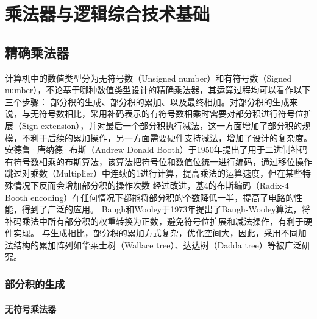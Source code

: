 \chapter{乘法器与逻辑综合技术基础}

\section{精确乘法器} \label{精确乘法器}


计算机中的数值类型分为无符号数（Unsigned number）和有符号数（Signed number），不论基于哪种数值类型设计的精确乘法器，其运算过程均可以看作以下三个步骤： 部分积的生成、部分积的累加、以及最终相加。对部分积的生成来说，与无符号数相比，采用补码表示的有符号数相乘时需要对部分积进行符号位扩展（Sign extension），并对最后一个部分积执行减法，这一方面增加了部分积的规模，不利于后续的累加操作，另一方面需要硬件支持减法，增加了设计的复杂度。
安德鲁·唐纳德·布斯（Andrew Donald Booth）于1950年提出了用于二进制补码有符号数相乘的布斯算法\cite{EM:booth_orig}，该算法把符号位和数值位统一进行编码，通过移位操作跳过对乘数（Multiplier）中连续的1进行计算，提高乘法的运算速度，但在某些特殊情况下反而会增加部分积的操作次数%
经过改进，基4的布斯编码（Radix-4 Booth encoding）在任何情况下都能将部分积的个数降低一半\cite{EM:booth_Macsorley,EM:booth_proof}，提高了电路的性能，得到了广泛的应用。
Baugh和Wooley于1973年提出了Baugh-Wooley算法\cite{EM:baugh-wooley}，将补码乘法中所有部分积的权重转换为正数，避免符号位扩展和减法操作，有利于硬件实现。
与生成相比，部分积的累加方式复杂，优化空间大，因此，采用不同加法结构的累加阵列如华莱士树（Wallace tree）\cite{EM:Wallace}、达达树（Dadda tree）\cite{EM:Dadda}等被广泛研究。

\subsection{部分积的生成}

\subsubsection{无符号乘法器}


